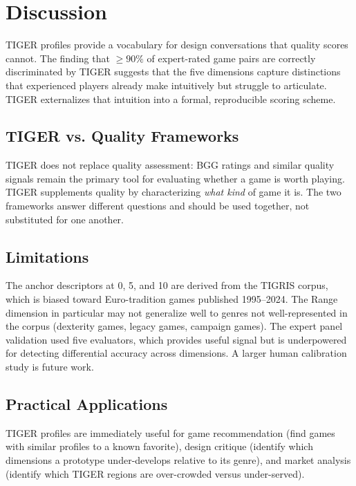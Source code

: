 \section{Discussion}
\label{sec:discussion}

TIGER profiles provide a vocabulary for design conversations that quality scores cannot.
The finding that $\geq 90\%$ of expert-rated game pairs are correctly discriminated by
TIGER suggests that the five dimensions capture distinctions that experienced players
already make intuitively but struggle to articulate. TIGER externalizes that intuition
into a formal, reproducible scoring scheme.

\subsection{TIGER vs. Quality Frameworks}

TIGER does not replace quality assessment: BGG ratings and similar quality signals
remain the primary tool for evaluating whether a game is worth playing. TIGER supplements
quality by characterizing \emph{what kind} of game it is. The two frameworks answer
different questions and should be used together, not substituted for one another.

\subsection{Limitations}

The anchor descriptors at 0, 5, and 10 are derived from the TIGRIS corpus, which is
biased toward Euro-tradition games published 1995--2024. The Range dimension in particular
may not generalize well to genres not well-represented in the corpus (dexterity games,
legacy games, campaign games). The expert panel validation used five evaluators, which
provides useful signal but is underpowered for detecting differential accuracy across
dimensions. A larger human calibration study is future work.

\subsection{Practical Applications}

TIGER profiles are immediately useful for game recommendation (find games with similar
profiles to a known favorite), design critique (identify which dimensions a prototype
under-develops relative to its genre), and market analysis (identify which TIGER regions
are over-crowded versus under-served).
